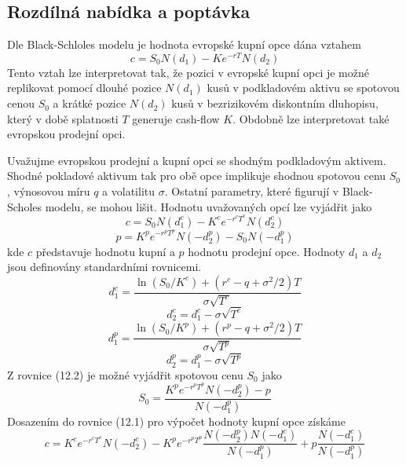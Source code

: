\documentclass[a4paper]{book}
\begin{document}
\subsection{Rozdílná nabídka a poptávka}

Dle Black-Schloles modelu je hodnota evropské kupní opce dána vztahem
\begin{equation*}
c = S_0N(d_1)-Ke^{-rT}N(d_2)
\end{equation*}
Tento vztah lze interpretovat tak, že pozici v evropské kupní opci je možné replikovat pomocí dlouhé pozice $N(d_1)$ kusů v podkladovém aktivu se spotovou cenou $S_0$ a krátké pozice $N(d_2)$ kusů v bezrizikovém diskontním dluhopisu, který v době splatnosti $T$ generuje cash-flow $K$. Obdobně lze interpretovat také evropskou prodejní opci.

Uvažujme evropskou prodejní a kupní opci se shodným podkladovým aktivem. Shodné pokladové aktivum tak pro obě opce implikuje shodnou spotovou cenu $S_0$, výnosovou míru $q$ a volatilitu $\sigma$. Ostatní parametry, které figurují v Black-Scholes modelu, se mohou lišit. Hodnotu uvažovaných opcí lze vyjádřit jako
\begin{equation}
c = S_0N(d_1^c)-K^ce^{-r^cT^c}N(d_2^c)
\end{equation}
\begin{equation}
p = K^pe^{-r^pT^p}N(-d_2^p)-S_0N(-d_1^p) 
\end{equation}
kde $c$ představuje hodnotu kupní a $p$ hodnotu prodejní opce. Hodnoty $d_1$ a $d_2$ jsou definovány standardními rovnicemi.
\begin{equation*}
d_1^c = \frac{\ln(S_0/K^c)+(r^c - q +\sigma^2/2)T}{\sigma \sqrt{T^c}}
\end{equation*}
\begin{equation*}
d_2^c = d_1^c - \sigma \sqrt{T^c}
\end{equation*}
\begin{equation*}
d_1^p = \frac{\ln(S_0/K^p)+(r^p - q +\sigma^2/2)T}{\sigma \sqrt{T^p}}
\end{equation*}
\begin{equation*}
d_2^p = d_1^p - \sigma \sqrt{T^p}
\end{equation*}
Z rovnice (12.2) je možné vyjádřit spotovou cenu $S_0$ jako
\begin{equation*}
S_0 = \frac{K^p e^{-r^pT^p}N(-d_2^p)-p}{N(-d_1^p)}
\end{equation*}
Dosazením do rovnice (12.1) pro výpočet hodnoty kupní opce získáme
\begin{equation}
c = K^ce^{-r^cT^c}N(-d_2^c)-K^pe^{-r^pT^p}\frac{N(-d_2^p)N(-d_1^c)}{N(-d_1^p)} + p \frac{N(-d_1^c)}{N(-d_1^p)} 
\end{equation}
\end{document}
